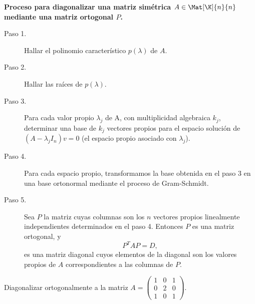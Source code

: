 \documentclass[compacto,10pt]{pubciencias-notas}
\begin{document}
\begin{advertencia}
\textbf{Proceso para diagonalizar una matriz simétrica $A\in\Mat[\K]{n}{n}$ mediante una matriz ortogonal $P$.}

\begin{description}
    \item[Paso 1.] Hallar el polinomio característico $p(\lambda)$ de $A$.
    \item[Paso 2.] Hallar las raíces de $p(\lambda)$.
    \item[Paso 3.] Para cada valor propio $\lambda_{j}$ de A, con multiplicidad algebraica $k_{j}$, determinar una base de $k_{j}$ vectores propios para el espacio solución de $(A - \lambda_{j}I_{n})v = 0$ (el espacio propio asociado con $\lambda_{j}$).
    \item[Paso 4.] Para cada espacio propio, transformamos la base obtenida en el paso 3 en una base ortonormal mediante el proceso de Gram-Schmidt.
    \item[Paso 5.] Sea $P$ la matriz cuyas columnas son los $n$ vectores propios linealmente independientes determinados en el paso 4. Entonces $P$ es una matriz ortogonal, y
    \[  
        P^{T}AP = D,
    \]
    es una matriz diagonal cuyos elementos de la diagonal son los valores propios de $A$ correspondientes a las columnas de $P$.
\end{description}
\end{advertencia}

\begin{ejer}\hspace{0pt} Diagonalizar ortogonalmente a la matriz $A = \begin{pmatrix} 1&0&1\\0&2&0\\1&0&1\end{pmatrix}$.
\end{ejer}
\end{document}
